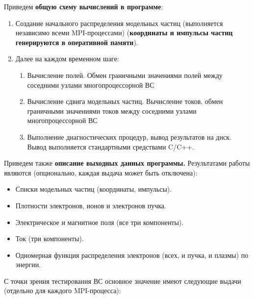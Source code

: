 Приведем \textbf{общую схему вычислений в программе}:
\begin{enumerate}
	\item Создание начального 
	распределения модельных частиц
	(выполняется независимо 
	всеми MPI-процессами) (\textbf{координаты и импульсы частиц генерируются в оперативной памяти}). 
	\item Далее на каждом временном шаге:
	\begin{enumerate}
		\item Вычисление полей. Обмен граничными значениями полей между соседними узлами многопроцессорной ВС
		\item Вычисление сдвига модельных частиц. Вычисление токов, обмен граничными значениями токов между соседними узлами многопроцессорной ВС
		\item Выполнение диагностических процедур, вывод результатов на диск. Вывод выполняется стандартными средствами C/C++.
	\end{enumerate}	
\end{enumerate}

Приведем также
\textbf{описание выходных данных программы.}
Результатами работы являются
(опционально, каждая выдача может быть отключена):
\begin{itemize}
	\item Списки модельных частиц (координаты, импульсы).
	\item Плотности электронов, ионов и электронов пучка.
	\item Электрическое и магнитное поля (все три компоненты).
	\item Ток (три компоненты).
	\item Одномерная функция распределения электронов (всех, и пучка, и плазмы) по энергии.
\end{itemize}

С точки зрения тестирования ВС основное значение имеют следующие выдачи (отдельно для каждого MPI-процесса):

